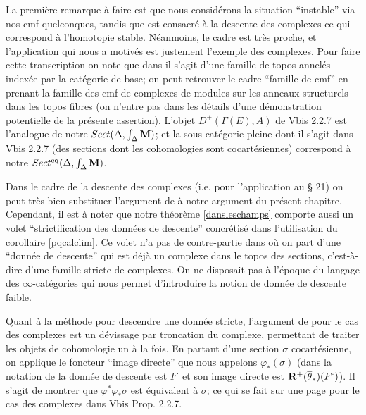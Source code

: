 \documentclass[12pt]{article}
\newcommand{\mm}{{\bf M}}
\begin{document}
La premi\`ere remarque \`a faire est que nous consid\'erons la situation
``instable'' via nos
cmf quelconques, tandis que \cite{SGA4b} est consacr\'e \`a la descente des
complexes ce qui
correspond \`a l'homotopie stable. N\'eanmoins, le cadre est tr\`es proche,
et l'application qui
nous a motiv\'es est justement l'exemple des complexes. Pour faire cette
transcription on note que
dans \cite{SGA4b} il s'agit d'une famille de topos annel\'es index\'ee
par la cat\'egorie de
base; on peut retrouver le cadre ``famille de cmf'' en prenant la famille des
cmf de complexes de
modules sur les anneaux structurels dans les topos fibres (on n'entre pas
dans les d\'etails d'une
d\'emonstration potentielle de la pr\'esente assertion). L'objet
$D^+(\underline{\Gamma}(E), A)$
de \cite{SGA4b} Vbis 2.2.7 est l'analogue de notre $Sect (\Delta , \int
_{\Delta}\mm )$; et
la sous-cat\'egorie pleine dont il s'agit dans
\cite{SGA4b} Vbis 2.2.7 (des sections dont les cohomologies sont
cocart\'esiennes) correspond \`a notre $Sect ^{\rm eq}(\Delta , \int
_{\Delta}\mm )$.

Dans le cadre de la descente des complexes (i.e. pour l'application au \S
21) on peut tr\`es bien
substituer l'argument de \cite{SGA4b} \`a notre argument du pr\'esent
chapitre. Cependant, il est
\`a noter que notre th\'eor\`eme \ref{dansleschamps} comporte aussi un
volet ``strictification des
donn\'ees de descente'' concr\'etis\'e dans l'utilisation du corollaire
\ref{pqcalclim}.
Ce volet n'a pas de contre-partie dans \cite{SGA4b} o\`u on part
d'une ``donn\'ee de
descente'' qui est d\'ej\`a un complexe dans le topos des sections,
c'est-\`a-dire d'une famille stricte
de complexes. On ne disposait pas \`a l'\'epoque du langage des
$\infty$-cat\'egories qui nous permet d'introduire
la notion de donn\'ee de descente faible.

Quant \`a la m\'ethode
pour descendre une donn\'ee stricte, l'argument de
\cite{SGA4b} pour le cas
des complexes est un d\'evissage par troncation du complexe, permettant de
traiter les objets de
cohomologie un \`a la fois. En partant d'une section $\sigma$
cocart\'esienne, on applique le
foncteur ``image directe'' que nous appelons $\varphi _{\ast}(\sigma )$
(dans la notation de
\cite{SGA4b} la donn\'ee de descente est $F^{\cdot}$ et son image directe est
${\bf R}^+ (\overline{\theta}_{\ast})(F^{\cdot})$). Il s'agit de montrer
que $\varphi
^{\ast}\varphi_{\ast} \sigma  $ est \'equivalent \`a $\sigma$; ce qui se
fait sur une page pour le
cas des complexes dans \cite{SGA4b} Vbis Prop. 2.2.7.
\end{document}
